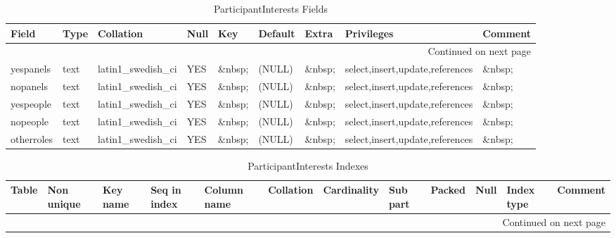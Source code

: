 \documentclass[tablesignature,landscape]{scrartcl}
\begin{document}
\begin{longtable}{|l|l|l|l|l|l|l|l|l|}
\caption{ParticipantInterests Fields} \label{tbl:participantinterestsfields}\\
\hline
 Field       &  Type         &  Collation                &  Null     &  Key      &  Default  &  Extra    &  Privileges                       &  Comment \\
\hline
\endhead
\hline\multicolumn{9}{r}{Continued on next page}\
\endfoot
\endlastfoot
\hline
 badgeid     &  varchar(15)  &  latin1\_{}swedish\_{}ci  &  \&nbsp;  &  PRI      &  \&nbsp;  &  \&nbsp;  &  select,insert,update,references  &  \&nbsp;  \\
 yespanels   &  text         &  latin1\_{}swedish\_{}ci  &  YES      &  \&nbsp;  &  (NULL)   &  \&nbsp;  &  select,insert,update,references  &  \&nbsp;  \\
 nopanels    &  text         &  latin1\_{}swedish\_{}ci  &  YES      &  \&nbsp;  &  (NULL)   &  \&nbsp;  &  select,insert,update,references  &  \&nbsp;  \\
 yespeople   &  text         &  latin1\_{}swedish\_{}ci  &  YES      &  \&nbsp;  &  (NULL)   &  \&nbsp;  &  select,insert,update,references  &  \&nbsp;  \\
 nopeople    &  text         &  latin1\_{}swedish\_{}ci  &  YES      &  \&nbsp;  &  (NULL)   &  \&nbsp;  &  select,insert,update,references  &  \&nbsp;  \\
 otherroles  &  text         &  latin1\_{}swedish\_{}ci  &  YES      &  \&nbsp;  &  (NULL)   &  \&nbsp;  &  select,insert,update,references  &  \&nbsp;  \\
\hline
\end{longtable}


\begin{longtable}{|l|l|l|l|l|l|l|l|l|l|l|l|}
\caption{ParticipantInterests Indexes} \label{tbl:participantinterestesindexes}\\
\hline
 Table                 &  Non unique  &  Key name  &  Seq in index  &  Column name  &  Collation  &  Cardinality  &  Sub part  &  Packed  &  Null     &  Index type  &  Comment \\
\hline
\endhead
\hline\multicolumn{12}{r}{Continued on next page}\
\endfoot
\endlastfoot
\hline
 ParticipantInterests  &           0  &  PRIMARY   &             1  &  badgeid      &  A          &            1  &  (NULL)    &  (NULL)  &  \&nbsp;  &  BTREE       &  \&nbsp;  \\
\hline
\end{longtable}
\end{document}
